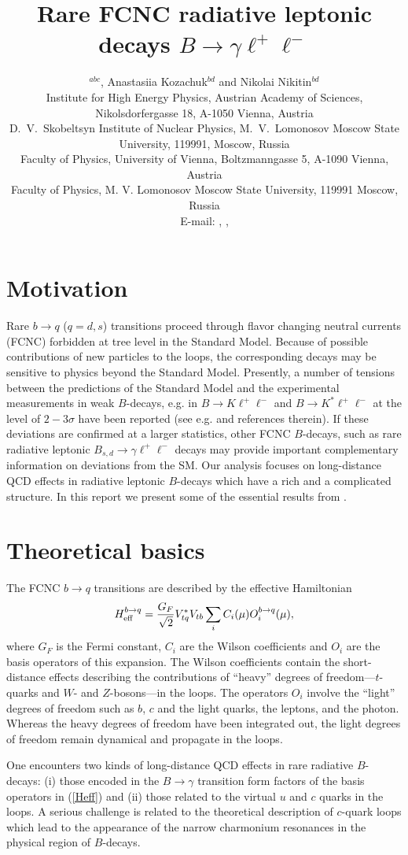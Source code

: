 \documentclass{PoS}
\title{Rare FCNC radiative leptonic decays $B\to\gamma\ell^+\ell^-$}
\author{\speaker{Dmitri Melikhov}$^{abc}$, Anastasiia Kozachuk$^{bd}$
and Nikolai Nikitin$^{bd}$\\
\llap{$^a$}
Institute for High Energy Physics, Austrian Academy of Sciences, Nikolsdorfergasse 18, A-1050 Vienna, Austria\\
\llap{$^b$}
D.~V.~Skobeltsyn Institute of Nuclear Physics, M.~V.~Lomonosov Moscow State University, 119991, Moscow, Russia\\
\llap{$^c$}
Faculty of Physics, University of Vienna, Boltzmanngasse 5, A-1090 Vienna, Austria\\ 
\llap{$^d$}Faculty of Physics, M. V. Lomonosov Moscow State University, 119991 Moscow, Russia\\
E-mail: \email{dmitri\_melikhov@gmx.de}, \email{anastasiia.kozachuk@cern.ch}, \email{Nikolai.Nikitine@cern.ch}
}
\begin{document}
\section{Motivation}
\label{sec-intro}
Rare $b\to q$ ($q=d,s$) transitions proceed through flavor changing neutral currents (FCNC) forbidden at tree level in the Standard Model. 
Because of possible contributions of new particles to the loops, the corresponding decays may be sensitive to physics beyond the Standard Model. 
Presently, a number of tensions between the predictions of the Standard Model and the experimental measurements in weak $B$-decays,
e.g. in $B\to K \ell^+\ell^-$ and $B\to K^* \ell^+\ell^-$ at the level of $2-3\sigma$ have been reported (see e.g. \cite{Diego} and references therein). 
If these deviations are confirmed at a larger statistics, other FCNC $B$-decays, such as rare radiative leptonic $B_{s,d}\to \gamma \ell^+\ell^-$ decays 
may provide important complementary information on deviations from the SM. Our analysis \cite{kmn} focuses on long-distance QCD effects in 
radiative leptonic $B$-decays which have a rich and a complicated structure. In this report we present some of the essential results from \cite{kmn}. 

\section{Theoretical basics}
The FCNC $b\to q$ transitions are described by the effective Hamiltonian \cite{Heff}
\begin{eqnarray}
\label{Heff}
H_{\rm eff}^{b\to q}=\frac{G_F}{\sqrt{2}}V^*_{tq}V_{tb}\sum_i C_i(\mu) O^{b\to q}_i(\mu),  
\end{eqnarray}
where $G_F$ is the Fermi constant, $C_i$ are the Wilson coefficients and $O_i$ are the basis operators of this expansion. 
The Wilson coefficients contain the short-distance effects describing the contributions of ``heavy'' degrees of 
freedom---$t$-quarks and $W$- and $Z$-bosons---in the loops. 
The operators $O_i$ involve the ``light'' degrees of freedom such as $b$, 
$c$ and the light quarks, the leptons, and the photon. 
Whereas the heavy degrees of freedom have been integrated out, the light degrees of freedom remain dynamical and propagate in the loops. 

One encounters two kinds of long-distance QCD effects in rare radiative $B$-decays: (i) those encoded in the $B\to\gamma$ transition form factors of 
the basis operators in (\ref{Heff}) and (ii) those related to the virtual $u$ and $c$ quarks in the loops. A serious challenge is related 
to the theoretical description of $c$-quark loops which lead to the appearance of the narrow charmonium resonances 
in the physical region of $B$-decays.  
\end{document}
